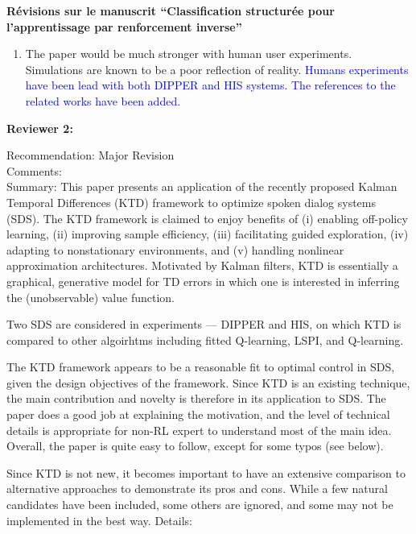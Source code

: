 \documentclass[11pt, a4paper]{letter}
\begin{document}
\begin{letter}{\large \textbf{Révisions sur le manuscrit ``Classification structurée pour l'apprentissage par renforcement inverse''}}
\begin{enumerate}
\textcolor{blue}{We rephrased this sentence in the abstract: ``.
However, each algorithm often solves a single issue at a time while
dialogue systems exhibit all the problems at once''}


\item The paper would be much stronger with human user experiments. Simulations are known to be a poor reflection of reality. \textcolor{blue}{ Humans experiments have been lead with both DIPPER and HIS systems. The references to the related works have been added.}
\end{enumerate}

\newpage
\begin{large} \textbf{Reviewer 2:} \\ \end{large}
 Recommendation: Major Revision\\
 Comments:\\
 Summary: This paper presents an application of the recently proposed Kalman
 Temporal Differences (KTD) framework to optimize spoken dialog systems
 (SDS).  The KTD framework is claimed to enjoy benefits of (i) enabling
 off-policy learning, (ii) improving sample efficiency, (iii) facilitating
 guided exploration, (iv) adapting to nonstationary environments, and (v)
 handling nonlinear approximation architectures.  Motivated by Kalman
 filters, KTD is essentially a graphical, generative model for TD errors in
 which one is interested in inferring the (unobservable) value function.

   Two SDS are considered in experiments --- DIPPER and HIS, on which KTD is
 compared to other algoirhtms including fitted Q-learning, LSPI, and
 Q-learning.

 The KTD framework appears to be a reasonable fit to optimal control in SDS,
 given the design objectives of the framework.  Since KTD is an existing
 technique, the main contribution and novelty is therefore in its
 application to SDS.  The paper does a good job at explaining the
 motivation, and the level of technical details is appropriate for non-RL
 expert to understand most of the main idea.  Overall, the paper is quite
 easy to follow, except for some typos (see below).

 Since KTD is not new, it becomes important to have an extensive comparison
 to alternative approaches to demonstrate its pros and cons.  While a few
 natural candidates have been included, some others are ignored, and some
 may not be implemented in the best way.  Details:



\end{letter}
\end{document}
